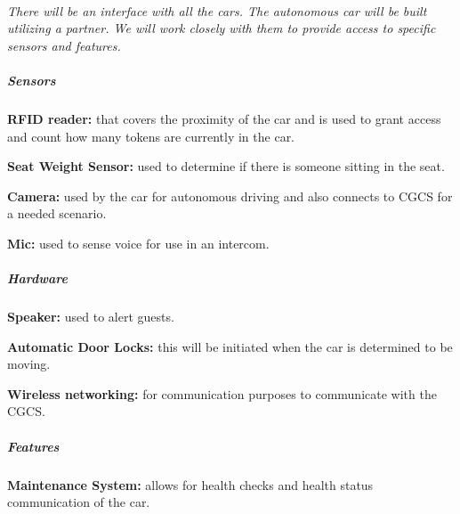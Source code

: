 \documentclass[12pt]{article}
\begin{document}
	\paragraph{} \textit{There will be an interface with all the cars. The autonomous car will be built utilizing a partner. We will work closely with them to provide access to specific sensors and features.}
		\subparagraph{Sensors}
			\begin{list}{}{}
					\item \textbf{RFID reader: }that covers the proximity of the car and is used to grant access and count how many tokens are currently in the car. 
					\item \textbf{Seat Weight Sensor: }used to determine if there is someone sitting in the seat. 
					\item \textbf{Camera: }used by the car for autonomous driving and also connects to CGCS for a needed scenario. 
					\item \textbf{Mic: }used to sense voice for use in an intercom.
			\end{list}
		\subparagraph{Hardware}
			\begin{list}{}{}
					\item \textbf{Speaker: }used to alert guests.
					\item \textbf{Automatic Door Locks: }this will be initiated when the car is determined to be moving.
					\item \textbf{Wireless networking: }for communication purposes to communicate with the CGCS.
			\end{list}
		\subparagraph{Features}
			\begin{list}{}{}
					\item \textbf{Maintenance System: }allows for health checks and health status communication of the car.  
			\end{list}
\end{document}
